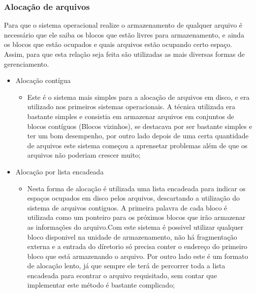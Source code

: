 \documentclass[12pt,a4paper,openany,oneside]{abntex2}
\begin{document}
\subsubsection{Alocação de arquivos}

 Para que o sistema operacional realize o armazenamento de qualquer arquivo é necessário que ele saiba os blocos que estão livres para armazenamento, e ainda os blocos que estão ocupados e quais arquivos estão ocupando certo espaço. Assim, para que esta relação seja feita são utilizadas as mais diversas formas de gerenciamento.

\begin{itemize}

\item Alocação contígua

	\begin{itemize}
		\item Este é o sistema mais simples para a alocação de arquivos em disco, e era utilizado nos primeiros sistemas operacionais. A técnica utilizada era bastante simples e consistia em armazenar arquivos em conjuntos de blocos contíguos (Blocos vizinhos), se destacava por ser bastante simples e ter um bom desempenho, por outro lado depois de uma certa quantidade de arquivos este sistema começou a aprensetar problemas além de que os arquivos não poderiam crescer muito;
	\end{itemize}


\item Alocação por lista encadeada
	
	\begin{itemize}
		\item Nesta forma de alocação é utilizada uma lista encadeada para indicar os espaços ocupados em disco pelos arquivos, descartando a utilização do sistema de arquivos contiguos. A primeira palavra de cada bloco é utilizada como um ponteiro para os próximos blocos que irão armazenar as informações do arquivo.Com este sistema é possivel utilizar qualquer bloco disponivel na unidade de armazenamento, não há fragmentação externa e a entrada do díretorio só precisa conter o endereço do primeiro bloco que está armazenando o arquivo. Por outro lado este é um formato de alocação lento, já que sempre ele terá de percorrer toda a lista encadeada para econtrar o arquivo requisitado, sem contar que implementar este método é bastante complicado;
	\end{itemize}


\end{itemize}
\end{document}
